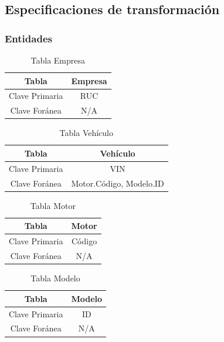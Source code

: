 \documentclass[12pt]{article}
\begin{document}
\newpage

\subsection{Especificaciones de transformaci\'on}

\subsubsection{Entidades}


\begin{table}[htbp]
\begin{center}
\begin{tabular}{|c|c|}
\hline
Tabla & Empresa \\
\hline
Clave Primaria & RUC \\
\hline
Clave Foránea & N/A \\
\hline
\end{tabular}
\caption{Tabla Empresa}
\label{tab:tablas}
\end{center}
\end{table}


\begin{table}[htbp]
\begin{center}
\begin{tabular}{|c|c|}
\hline
Tabla & Vehículo \\
\hline
Clave Primaria & VIN \\
\hline
Clave Foránea & Motor.Código, Modelo.ID \\
\hline
\end{tabular}
\caption{Tabla Vehículo}
\label{tab:tablas}
\end{center}
\end{table}


\begin{table}[htbp]
\begin{center}
\begin{tabular}{|c|c|}
\hline
Tabla & Motor \\
\hline
Clave Primaria & Código \\
\hline
Clave Foránea & N/A \\
\hline
\end{tabular}
\caption{Tabla Motor}
\label{tab:tablas}
\end{center}
\end{table}


\begin{table}[htbp]
\begin{center}
\begin{tabular}{|c|c|}
\hline
Tabla & Modelo \\
\hline
Clave Primaria & ID \\
\hline
Clave Foránea & N/A \\
\hline
\end{tabular}
\caption{Tabla Modelo}
\label{tab:tablas}
\end{center}
\end{table}
\end{document}
